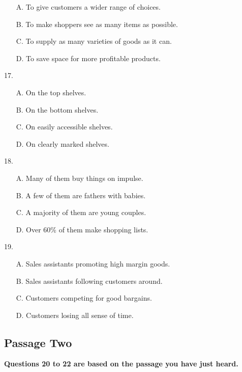 \documentclass[UTF8,11pt]{ctexart}
\begin{document}
\begin{itemize}[leftmargin=2em,itemsep=.2em,topsep=.4em]\item[A.] To give customers a wider range of choices.
\item[B.] To make shoppers see as many items as possible.
\item[C.] To supply as many varieties of goods as it can.
\item[D.] To save space for more profitable products.
\end{itemize}

17.


\begin{itemize}[leftmargin=2em,itemsep=.2em,topsep=.4em]\item[A.] On the top shelves.
\item[B.] On the bottom shelves.
\item[C.] On easily accessible shelves.
\item[D.] On clearly marked shelves.
\end{itemize}

18.


\begin{itemize}[leftmargin=2em,itemsep=.2em,topsep=.4em]\item[A.] Many of them buy things on impulse.
\item[B.] A few of them are fathers with babies.
\item[C.] A majority of them are young couples.
\item[D.] Over 60\% of them make shopping lists.
\end{itemize}

19.


\begin{itemize}[leftmargin=2em,itemsep=.2em,topsep=.4em]\item[A.] Sales assistants promoting high margin goods.
\item[B.] Sales assistants following customers around.
\item[C.] Customers competing for good bargains.
\item[D.] Customers losing all sense of time.
\end{itemize}

\subsection*{\textbf{Passage Two}}


\textbf{Questions 20 to 22 are based on the passage you have just heard.}
\end{document}
